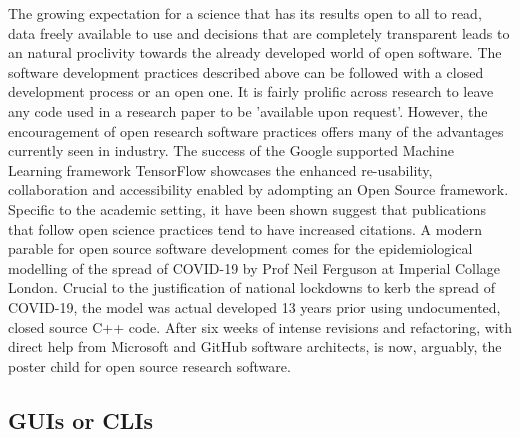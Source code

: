 \documentclass{SBCbookchapter}
\begin{document}
The growing expectation for a science that has its results open to all to read, data freely available to use and decisions that are completely transparent leads to an natural proclivity towards the already developed world of open software. The software development practices described above can be followed with a closed development process or an open one. It is fairly prolific across research to leave any code used in a research paper to be 'available upon request'. However, the encouragement of open research software practices offers many of the advantages currently seen in industry. The success of the Google supported Machine Learning framework TensorFlow showcases the enhanced re-usability, collaboration and accessibility enabled by adompting an Open Source framework. Specific to the academic setting,  it have been shown suggest that publications that follow open science practices tend to have increased citations. A modern parable for open source software development comes for the epidemiological modelling of the spread of COVID-19 by Prof Neil Ferguson at Imperial Collage London. Crucial to the justification of national lockdowns to kerb the spread of COVID-19, the model was actual developed 13 years prior using undocumented, closed source C++ code. After six weeks of intense revisions and refactoring, with direct help from Microsoft and GitHub software architects,  is now, arguably, the poster child for open source research software.




\subsection{GUIs or CLIs}
\end{document}
